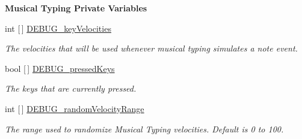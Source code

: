 \begin{Indent}\textbf{ Musical Typing Private Variables}\par
\begin{DoxyCompactItemize}
\item 
int \mbox{[}$\,$\mbox{]} \hyperlink{group___audio_testing_ga8b2a043e6f3bfd5e019b2016ba39a0d0}{D\+E\+B\+U\+G\+\_\+key\+Velocities}
\begin{DoxyCompactList}\small\item\em The velocities that will be used whenever musical typing simulates a note event. \end{DoxyCompactList}\item 
bool \mbox{[}$\,$\mbox{]} \hyperlink{group___audio_testing_gab5331debd3f5b0bde90200b5ac989a18}{D\+E\+B\+U\+G\+\_\+pressed\+Keys}
\begin{DoxyCompactList}\small\item\em The keys that are currently pressed. \end{DoxyCompactList}\item 
int \mbox{[}$\,$\mbox{]} \hyperlink{group___audio_testing_gac9475fee2b2b0fd7c25c6258d28b8039}{D\+E\+B\+U\+G\+\_\+random\+Velocity\+Range}
\begin{DoxyCompactList}\small\item\em The range used to randomize Musical Typing velocities. Default is 0 to 100. \end{DoxyCompactList}\end{DoxyCompactItemize}
\end{Indent}
